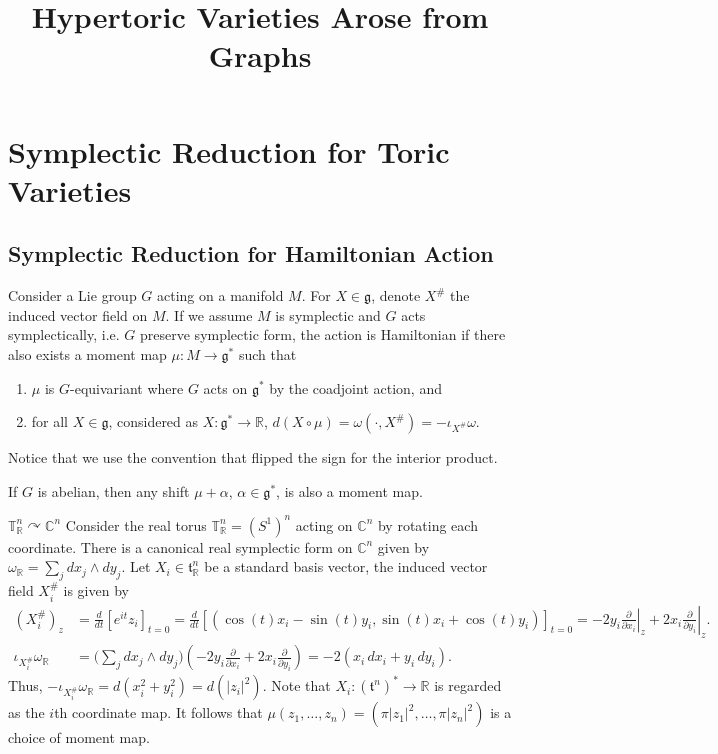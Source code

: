\documentclass[b5paper]{article}
\title{\bf{
Hypertoric Varieties Arose from Graphs
}}
\newcommand{\acton}{\curvearrowright}
\newcommand{\ind}[1]{#1^\#}
\newcommand{\intd}[1]{\iota_{#1}}
\begin{document}
\maketitle
\vspace{-3.5em}
%

\thispagestyle{empty}
\tableofcontents
\listoftodos

\section{Symplectic Reduction for Toric Varieties}

\subsection{Symplectic Reduction for Hamiltonian Action}

Consider a Lie group $G$ acting on a manifold $M$. For $X\in\mathfrak{g}$, denote $\ind{X}$ the induced vector field on $M$. If we assume $M$ is symplectic and $G$ acts symplectically, i.e. $G$ preserve symplectic form, the action is Hamiltonian if there also exists a moment map $\mu : M \to \mathfrak{g}^*$ such that
\begin{enumerate}
    \item $\mu$ is $G$-equivariant where $G$ acts on $\mathfrak{g}^*$ by the coadjoint action, and
    \item for all $X \in \mathfrak{g}$, considered as $X : \mathfrak{g}^* \to \mathbb{R}$, $d(X \circ \mu) = \omega(\cdot ,\ind{X})=-\intd{\ind{X}}\omega$.
\end{enumerate}
Notice that we use the convention that flipped the sign for the interior product.

If $G$ is abelian, then any shift $\mu+\alpha$, $\alpha\in\mathfrak{g}^*$, is also a moment map.

\begin{example}{$\mathbb{T}_\mathbb{R}^n \acton \mathbb{C}^n$}
    Consider the real torus $\mathbb{T}_\mathbb{R}^n=(S^1)^n$ acting on $\mathbb{C}^n$ by rotating each coordinate. There is a canonical real symplectic form on $\mathbb{C}^n$ given by $\omega_\mathbb{R}=\sum_jdx_j\wedge dy_j$. Let $X_i\in\mathfrak{t}_\mathbb{R}^n$ be a standard basis vector, 
    the induced vector field $\ind{X_i}$ is given by
    \begin{align*}
        (\ind{X_i})_z &= \frac{d}{dt} [e^{it} z_i]_{t=0}
        = \frac{d}{dt} [(\cos(t) x_i - \sin(t) y_i,\sin(t)x_i + \cos(t)y_i)]_{t=0}
        = -2y_i \left.\frac{\partial}{\partial x_i}\right|_z + 2x_i \left.\frac{\partial}{\partial y_i}\right|_z.\\
        \intd{\ind{X_i}}\omega_\mathbb{R} &= \biggl(\sum_j dx_j \wedge dy_j\biggr)\left(-2 y_i \frac{\partial}{\partial x_i} + 2 x_i \frac{\partial}{\partial y_i}\right)
        = -2 (x_i \, dx_i + y_i \, dy_i).
    \end{align*}
    Thus, $-\intd{\ind{X_i}}\omega_\mathbb{R} = d(x_i^2 + y_i^2) = d(|z_i|^2)$. Note that $X_i : (\mathfrak{t}^n)^* \to \mathbb{R}$ is regarded as the $i$th coordinate map. It follows that $\mu(z_1, \dots, z_n) = (\pi|z_1|^2, \dots, \pi|z_n|^2)$ is a choice of moment map.
\end{example}
\end{document}
